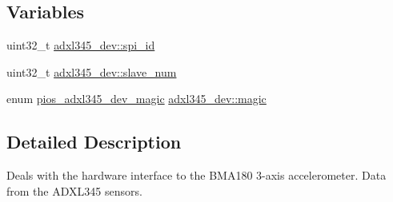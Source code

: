 \subsection*{\-Variables}
\begin{DoxyCompactItemize}
\item 
uint32\-\_\-t \hyperlink{group___p_i_o_s___a_d_x_l345_ga2681cf2ea08ddf51ce6cea962e6ea9a7}{adxl345\-\_\-dev\-::spi\-\_\-id}
\item 
uint32\-\_\-t \hyperlink{group___p_i_o_s___a_d_x_l345_ga0955d4176a279516aa3b7dcbea03965c}{adxl345\-\_\-dev\-::slave\-\_\-num}
\item 
enum \hyperlink{group___p_i_o_s___a_d_x_l345_ga2f1fd1a4af16c722d816221da8924b5c}{pios\-\_\-adxl345\-\_\-dev\-\_\-magic} \hyperlink{group___p_i_o_s___a_d_x_l345_ga71c28fb64e7d683548f06eb171dc5cde}{adxl345\-\_\-dev\-::magic}
\end{DoxyCompactItemize}


\subsection{\-Detailed \-Description}
\-Deals with the hardware interface to the \-B\-M\-A180 3-\/axis accelerometer. \-Data from the \-A\-D\-X\-L345 sensors. 

